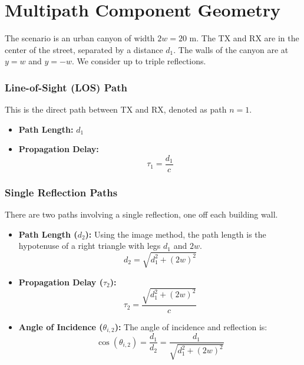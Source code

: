 \section{Multipath Component Geometry}
The scenario is an urban canyon of width $2w = 20$ m. The TX and RX are in the center of the street, separated by a distance $d_1$. The walls of the canyon are at $y = w$ and $y = -w$. We consider up to triple reflections.

\subsubsection{Line-of-Sight (LOS) Path}
This is the direct path between TX and RX, denoted as path $n=1$.
\begin{itemize}
	\item \textbf{Path Length:} $d_1$
	\item \textbf{Propagation Delay:}
	\begin{equation}
		\tau_1 = \frac{d_1}{c}
	\end{equation}
\end{itemize}

\subsubsection{Single Reflection Paths}
There are two paths involving a single reflection, one off each building wall.
\begin{itemize}
	\item \textbf{Path Length ($d_2$):} Using the image method, the path length is the hypotenuse of a right triangle with legs $d_1$ and $2w$.
	\begin{equation}
		d_2 = \sqrt{d_1^2 + (2w)^2}
	\end{equation}
	\item \textbf{Propagation Delay ($\tau_{2}$):}
	\begin{equation}
		\tau_{2} = \frac{\sqrt{d_1^2 + (2w)^2}}{c}
	\end{equation}
	\item \textbf{Angle of Incidence ($\theta_{i,2}$):} The angle of incidence and reflection is:
	\begin{equation}
		\cos(\theta_{i,2}) = \frac{d_1}{d_2} = \frac{d_1}{\sqrt{d_1^2 + (2w)^2}}
	\end{equation}
\end{itemize}

